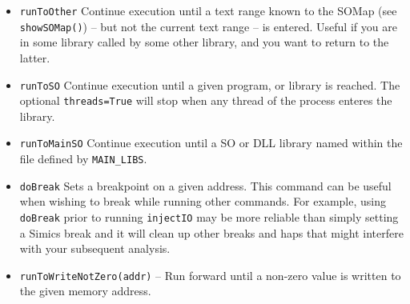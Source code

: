 \documentclass[titlepage]{article}
\begin{document}
\begin{itemize}
\item {\tt runToOther} Continue execution until a text range known to the SOMap (see {\tt showSOMap()}) -- but not the current text range -- is entered.
Useful if you are in some library called by some other library, and you want to return to the latter.

\item {\tt runToSO} Continue execution until a given program, or library is reached.  The optional {\tt threads=True} will stop when any thread of the
process enteres the library.
\item {\tt runToMainSO} Continue execution until a SO or DLL library named within the file defined by {\tt MAIN\_LIBS}.

\item {\tt doBreak} Sets a breakpoint on a given address.  This command can be useful when wishing to break while running other commands.  For example,
using {\tt doBreak} prior to running {\tt injectIO} may be more reliable than simply setting a Simics break and it will clean up other breaks and haps that 
might interfere with your subsequent analysis.

\item {\tt runToWriteNotZero(addr)} – Run forward until a non-zero value is written to the given memory address.


\end{itemize}
\end{document}
